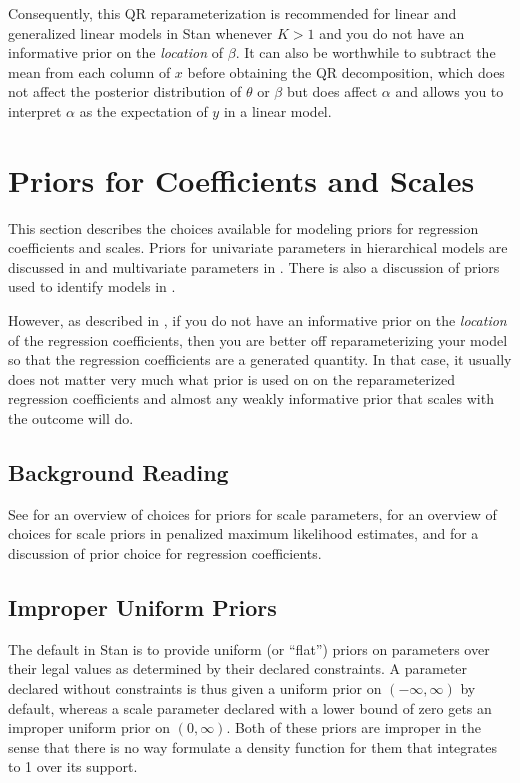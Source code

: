%
Consequently, this QR reparameterization is recommended for linear and
generalized linear models in Stan whenever $K > 1$ and you do not have
an informative prior on the \emph{location} of $\beta$. It can also be
worthwhile to subtract the mean from each column of $x$ before
obtaining the QR decomposition, which does not affect the posterior
distribution of $\theta$ or $\beta$ but does affect $\alpha$ and
allows you to interpret $\alpha$ as the expectation of $y$ in a linear
model.

\section{Priors for Coefficients and Scales}\label{regression-priors.section}

This section describes the choices available for modeling priors for
regression coefficients and scales.  Priors for univariate parameters
in hierarchical models are discussed in
 and multivariate parameters in
. There is also a
discussion of priors used to identify models in
.

However, as described in , if you do
not have an informative prior on the \emph{location} of the regression
coefficients, then you are better off reparameterizing your model so
that the regression coefficients are a generated quantity. In that case,
it usually does not matter very much what prior is used on on the
reparameterized regression coefficients and almost any weakly informative
prior that scales with the outcome will do.

\subsection{Background Reading}

See \citep{Gelman:2006} for an overview of choices for priors for
scale parameters, \citep{ChungEtAl:2013} for an overview of choices
for scale priors in penalized maximum likelihood estimates, and
\cite{GelmanJakulinPittauEtAl:2008} for a discussion of prior choice
for regression coefficients.

\subsection{Improper Uniform Priors}

The default in Stan is to provide uniform (or ``flat'') priors on
parameters over their legal values as determined by their declared
constraints.  A parameter declared without constraints is thus given a
uniform prior on $(-\infty,\infty)$ by default, whereas a scale
parameter declared with a lower bound of zero gets an improper uniform
prior on $(0,\infty)$.  Both of these priors are improper in the sense
that there is no way formulate a density function for them that
integrates to 1 over its support.

